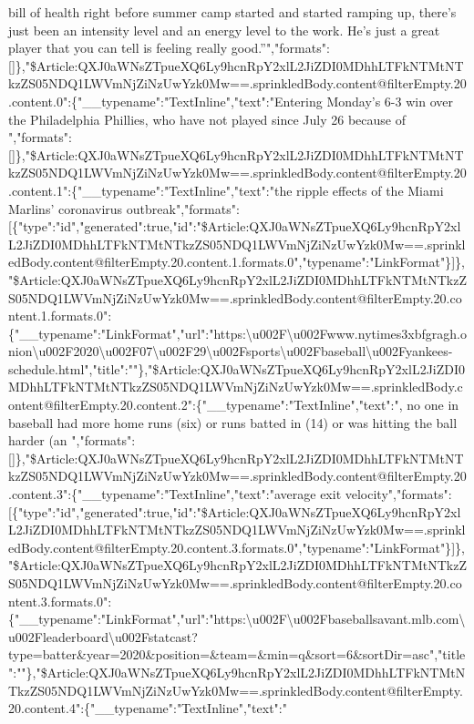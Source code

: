 bill of health right before summer camp started and started ramping up,
there's just been an intensity level and an energy level to the work.
He's just a great player that you can tell is feeling really
good.''","formats":{[}{]}\},"\$Article:QXJ0aWNsZTpueXQ6Ly9hcnRpY2xlL2JiZDI0MDhhLTFkNTMtNTkzZS05NDQ1LWVmNjZiNzUwYzk0Mw==.sprinkledBody.content@filterEmpty.20.content.0":\{"\_\_typename":"TextInline","text":"Entering
Monday's 6-3 win over the Philadelphia Phillies, who have not played
since July 26 because of
","formats":{[}{]}\},"\$Article:QXJ0aWNsZTpueXQ6Ly9hcnRpY2xlL2JiZDI0MDhhLTFkNTMtNTkzZS05NDQ1LWVmNjZiNzUwYzk0Mw==.sprinkledBody.content@filterEmpty.20.content.1":\{"\_\_typename":"TextInline","text":"the
ripple effects of the Miami Marlins' coronavirus
outbreak","formats":{[}\{"type":"id","generated":true,"id":"\$Article:QXJ0aWNsZTpueXQ6Ly9hcnRpY2xlL2JiZDI0MDhhLTFkNTMtNTkzZS05NDQ1LWVmNjZiNzUwYzk0Mw==.sprinkledBody.content@filterEmpty.20.content.1.formats.0","typename":"LinkFormat"\}{]}\},"\$Article:QXJ0aWNsZTpueXQ6Ly9hcnRpY2xlL2JiZDI0MDhhLTFkNTMtNTkzZS05NDQ1LWVmNjZiNzUwYzk0Mw==.sprinkledBody.content@filterEmpty.20.content.1.formats.0":\{"\_\_typename":"LinkFormat","url":"https:\textbackslash{}u002F\textbackslash{}u002Fwww.nytimes3xbfgragh.onion\textbackslash{}u002F2020\textbackslash{}u002F07\textbackslash{}u002F29\textbackslash{}u002Fsports\textbackslash{}u002Fbaseball\textbackslash{}u002Fyankees-schedule.html","title":""\},"\$Article:QXJ0aWNsZTpueXQ6Ly9hcnRpY2xlL2JiZDI0MDhhLTFkNTMtNTkzZS05NDQ1LWVmNjZiNzUwYzk0Mw==.sprinkledBody.content@filterEmpty.20.content.2":\{"\_\_typename":"TextInline","text":",
no one in baseball had more home runs (six) or runs batted in (14) or
was hitting the ball harder (an
","formats":{[}{]}\},"\$Article:QXJ0aWNsZTpueXQ6Ly9hcnRpY2xlL2JiZDI0MDhhLTFkNTMtNTkzZS05NDQ1LWVmNjZiNzUwYzk0Mw==.sprinkledBody.content@filterEmpty.20.content.3":\{"\_\_typename":"TextInline","text":"average
exit
velocity","formats":{[}\{"type":"id","generated":true,"id":"\$Article:QXJ0aWNsZTpueXQ6Ly9hcnRpY2xlL2JiZDI0MDhhLTFkNTMtNTkzZS05NDQ1LWVmNjZiNzUwYzk0Mw==.sprinkledBody.content@filterEmpty.20.content.3.formats.0","typename":"LinkFormat"\}{]}\},"\$Article:QXJ0aWNsZTpueXQ6Ly9hcnRpY2xlL2JiZDI0MDhhLTFkNTMtNTkzZS05NDQ1LWVmNjZiNzUwYzk0Mw==.sprinkledBody.content@filterEmpty.20.content.3.formats.0":\{"\_\_typename":"LinkFormat","url":"https:\textbackslash{}u002F\textbackslash{}u002Fbaseballsavant.mlb.com\textbackslash{}u002Fleaderboard\textbackslash{}u002Fstatcast?type=batter\&year=2020\&position=\&team=\&min=q\&sort=6\&sortDir=asc","title":""\},"\$Article:QXJ0aWNsZTpueXQ6Ly9hcnRpY2xlL2JiZDI0MDhhLTFkNTMtNTkzZS05NDQ1LWVmNjZiNzUwYzk0Mw==.sprinkledBody.content@filterEmpty.20.content.4":\{"\_\_typename":"TextInline","text":"
